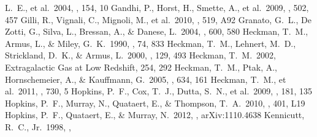 \documentclass[apj]{emulateapj}
\begin{document}
\begin{thebibliography}{}
  L.~E., et al.\ 2004, \apjs, 154, 10
 Gandhi, P., Horst, H., Smette,
  A., et al.\ 2009, \aap, 502, 457
 Gilli, R., Vignali, C., Mignoli,
  M., et al.\ 2010, \aap, 519, A92
 Granato, G.~L., De Zotti, G.,
  Silva, L., Bressan, A., \& Danese, L.\ 2004, \apj, 600, 580
 Heckman, T.~M., Armus, L., \&
  Miley, G.~K.\ 1990, \apjs, 74, 833
 Heckman, T.~M., Lehnert, M.~D.,
  Strickland, D.~K., \& Armus, L.\ 2000, \apjs, 129, 493
 Heckman, T.~M.\ 2002, Extragalactic Gas
  at Low Redshift, 254, 292
 Heckman, T.~M., Ptak, A.,
  Hornschemeier, A., \& Kauffmann, G.\ 2005, \apj, 634, 161
 Heckman, T.~M., et al.\ 2011,
  \apj, 730, 5
 Hopkins, P.~F., Cox, T.~J.,
  Dutta, S.~N., et al.\ 2009, \apjs, 181, 135
 Hopkins, P.~F., Murray, N.,
  Quataert, E., \& Thompson, T.~A.\ 2010, \mnras, 401, L19
 Hopkins, P.~F., Quataert, E., \&
  Murray, N.\ 2012, \mnras, arXiv:1110.4638
 Kennicutt, R.~C., Jr.\ 1998, \apj,

\end{thebibliography}
\end{document}

